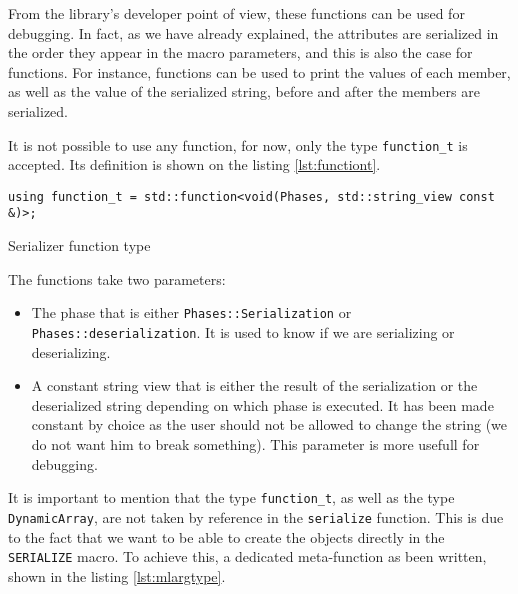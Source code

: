From the library's developer point of view, these functions can be used for
debugging. In fact, as we have already explained, the attributes are serialized
in the order they appear in the macro parameters, and this is also the case for
functions. For instance, functions can be used to print the values of each
member, as well as the value of the serialized string, before and after the
members are serialized.

It is not possible to use any function, for now, only the type
\texttt{function\_t} is accepted. Its definition is shown on the listing
\ref{lst:functiont}.

\begin{listing}[ht!]
\begin{verbatim}
using function_t = std::function<void(Phases, std::string_view const &)>;
\end{verbatim}
\caption{Serializer function type}
\label{lst:functiont}
\end{listing}

The functions take two parameters:

\begin{itemize}
  \item The phase that is either \texttt{Phases::Serialization} or
    \texttt{Phases::deserialization}. It is used to know if we are serializing
    or deserializing.
  \item A constant string view that is either the result of the serialization or
    the deserialized string depending on which phase is executed. It has been
    made constant by choice as the user should not be allowed to change the
    string (we do not want him to break something). This parameter is more
    usefull for debugging.
\end{itemize}

It is important to mention that the type \texttt{function\_t}, as well as the
type \texttt{DynamicArray}, are not taken by reference in the \texttt{serialize}
function. This is due to the fact that we want to be able to create the objects
directly in the \texttt{SERIALIZE} macro. To achieve this, a dedicated
meta-function as been written, shown in the listing \ref{lst:mlargtype}.

